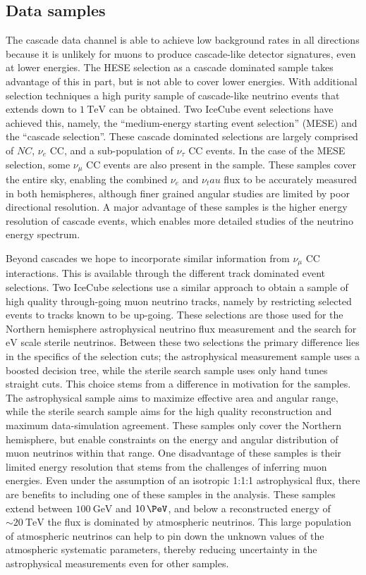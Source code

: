 \subsection{Data samples}
The cascade data channel is able to achieve low background rates in all directions because it is unlikely for muons to produce cascade-like detector signatures, even at lower energies.
The HESE selection as a cascade dominated sample takes advantage of this in part, but is not able to cover lower energies.
With additional selection techniques a high purity sample of cascade-like neutrino events that extends down to $\SI{1}\TeV$ can be obtained.
Two IceCube event selections have achieved this, namely, the ``medium-energy starting event selection'' (MESE) and the ``cascade selection''.
These cascade dominated selections are largely comprised of $NC$, $\nu_e$ CC, and a sub-population of $\nu_\tau$ CC events.
In the case of the MESE selection, some $\nu_\mu$ CC events are also present in the sample.
These samples cover the entire sky, enabling the combined $\nu_e$ and $\nu_tau$ flux to be accurately measured in both hemispheres, although finer grained angular studies are limited by poor directional resolution.
A major advantage of these samples is the higher energy resolution of cascade events, which enables more detailed studies of the neutrino energy spectrum.

Beyond cascades we hope to incorporate similar information from $\nu_\mu$ CC interactions.
This is available through the different track dominated event selections.
Two IceCube selections use a similar approach to obtain a sample of high quality through-going muon neutrino tracks, namely by restricting selected events to tracks known to be up-going.
These selections are those used for the Northern hemisphere astrophysical neutrino flux measurement and the search for $\si\eV$ scale sterile neutrinos.
Between these two selections the primary difference lies in the specifics of the selection cuts; the astrophysical measurement sample uses a boosted decision tree, while the sterile search sample uses only hand tunes straight cuts.
This choice stems from a difference in motivation for the samples.
The astrophysical sample aims to maximize effective area and angular range, while the sterile search sample aims for the high quality reconstruction and maximum data-simulation agreement.
These samples only cover the Northern hemisphere, but enable constraints on the energy and angular distribution of muon neutrinos within that range.
One disadvantage of these samples is their limited energy resolution that stems from the challenges of inferring muon energies.
Even under the assumption of an isotropic 1:1:1 astrophysical flux, there are benefits to including one of these samples in the analysis.
These samples extend between $\SI{100}\GeV$ and $\SI{10}\PeV$, and below a reconstructed energy of $\sim\SI{20}\TeV$ the flux is dominated by atmospheric neutrinos.
This large population of atmospheric neutrinos can help to pin down the unknown values of the atmospheric systematic parameters, thereby reducing uncertainty in the astrophysical measurements even for other samples.


